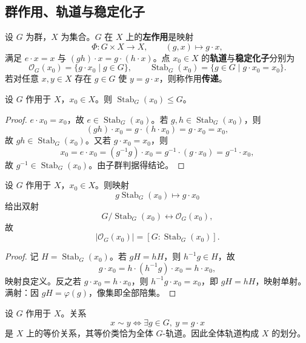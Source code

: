 \subsection{群作用、轨道与稳定化子}

\begin{definition}\label{def:group_action}
设 $G$ 为群，$X$ 为集合。$G$ 在 $X$ 上的\textbf{左作用}是映射
\[
\Phi:G\times X\to X,\qquad (g,x)\mapsto g\cdot x,
\]
满足 $e\cdot x=x$ 与 $(gh)\cdot x=g\cdot(h\cdot x)$。点 $x_0\in X$ 的\textbf{轨道}与\textbf{稳定化子}分别为
\[
\mathcal{O}_G(x_0)=\{g\cdot x_0\mid g\in G\},\qquad
\operatorname{Stab}_G(x_0)=\{g\in G\mid g\cdot x_0=x_0\}.
\]
若对任意 $x,y\in X$ 存在 $g\in G$ 使 $y=g\cdot x$，则称作用\textbf{传递}。
\end{definition}

\begin{proposition}[稳定化子是子群]\label{prop:stabilizer_subgroup}
设 $G$ 作用于 $X$，$x_0\in X$。则 $\operatorname{Stab}_G(x_0)\le G$。
\end{proposition}

\begin{proof}
$e\cdot x_0=x_0$，故 $e\in\operatorname{Stab}_G(x_0)$。若 $g,h\in\operatorname{Stab}_G(x_0)$，则
\[
(gh)\cdot x_0=g\cdot(h\cdot x_0)=g\cdot x_0=x_0,
\]
故 $gh\in\operatorname{Stab}_G(x_0)$。又若 $g\cdot x_0=x_0$，则
\[
x_0=e\cdot x_0=(g^{-1}g)\cdot x_0=g^{-1}\cdot(g\cdot x_0)=g^{-1}\cdot x_0,
\]
故 $g^{-1}\in\operatorname{Stab}_G(x_0)$。由子群判据得结论。
\end{proof}

\begin{lemma}[轨道--稳定化子]\label{lem:orbit_stabilizer}
设 $G$ 作用于 $X$，$x_0\in X$。则映射
\[
g\operatorname{Stab}_G(x_0)\mapsto g\cdot x_0
\]
给出双射
\[
G/\operatorname{Stab}_G(x_0)\longleftrightarrow \mathcal{O}_G(x_0),
\]
故
\[
|\mathcal{O}_G(x_0)|=[G:\operatorname{Stab}_G(x_0)].
\]
\end{lemma}

\begin{proof}
记 $H=\operatorname{Stab}_G(x_0)$。若 $gH=hH$，则 $h^{-1}g\in H$，故
\[
g\cdot x_0=h\cdot(h^{-1}g)\cdot x_0=h\cdot x_0,
\]
映射良定义。反之若 $g\cdot x_0=h\cdot x_0$，则 $h^{-1}g\cdot x_0=x_0$，即 $gH=hH$，映射单射。满射：因 $gH=\varphi(g)$，像集即全部陪集。
\end{proof}

\begin{theorem}[轨道划分]\label{thm:orbit_partition}
设 $G$ 作用于 $X$。关系
\[
x\sim y \iff \exists g\in G,\ y=g\cdot x
\]
是 $X$ 上的等价关系，其等价类恰为全体 $G$-轨道。因此全体轨道构成 $X$ 的划分。
\end{theorem}

